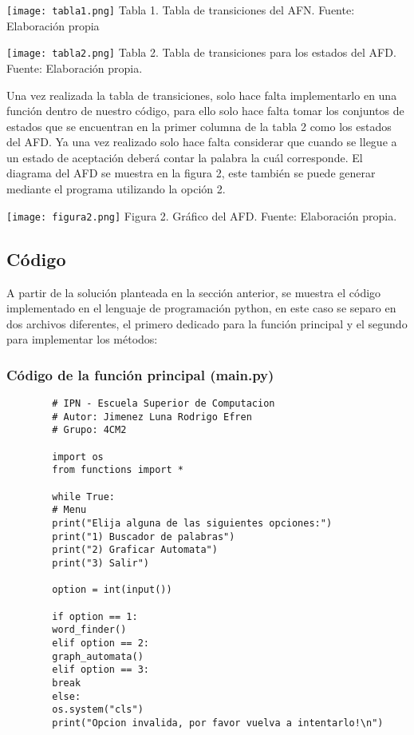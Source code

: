 \documentclass{article}
\begin{document}
	\begin{center}
		\texttt{[image: tabla1.png]}
		\small Tabla 1. Tabla de transiciones del AFN. Fuente: Elaboración propia
	\end{center}
	
	\begin{center}
		\texttt{[image: tabla2.png]}
		\small Tabla 2. Tabla de transiciones para los estados del AFD. Fuente: Elaboración propia.
	\end{center}
	
	Una vez realizada la tabla de transiciones, solo hace falta implementarlo en una función dentro de nuestro código, para ello solo hace falta tomar los conjuntos de estados que se encuentran en la primer columna de la tabla 2 como los estados del AFD. Ya una vez realizado solo hace falta considerar que cuando se llegue a un estado de aceptación deberá contar la palabra la cuál corresponde. El diagrama del AFD se muestra en la figura 2, este también se puede generar mediante el programa utilizando la opción 2.
	
	\begin{center}
		\texttt{[image: figura2.png]}
		\small Figura 2. Gráfico del AFD. Fuente: Elaboración propia.
	\end{center}
	
	\subsection{Código}
	
	A partir de la solución planteada en la sección anterior, se muestra el código implementado en el lenguaje de programación python, en este caso se separo en dos archivos diferentes, el primero dedicado para la función principal y el segundo para implementar los métodos:
	
	\subsubsection{Código de la función principal (main.py)}
	\begin{lstlisting}
		# IPN - Escuela Superior de Computacion
		# Autor: Jimenez Luna Rodrigo Efren
		# Grupo: 4CM2
		
		import os
		from functions import *
		
		while True:
		# Menu
		print("Elija alguna de las siguientes opciones:")
		print("1) Buscador de palabras")
		print("2) Graficar Automata")
		print("3) Salir")
		
		option = int(input())
		
		if option == 1:
		word_finder()
		elif option == 2:
		graph_automata()
		elif option == 3:
		break
		else:
		os.system("cls")
		print("Opcion invalida, por favor vuelva a intentarlo!\n")
	\end{lstlisting}
	
\end{document}
